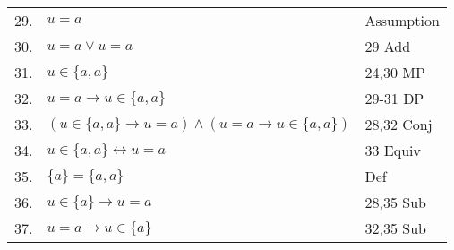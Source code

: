 \documentclass[12pt, a4paper]{article}
\begin{document}
\begin{table}[h!]
\begin{center}
\begin{tabular}{l l l}
        29.& $u=a$ & Assumption\\
        
        30.& \hspace{10mm}$u=a\vee u=a$ & 29 Add\\
        
        31.& \hspace{10mm}$u\in\{a,a\}$ & 24,30 MP\\
        
        32.& $u=a\rightarrow u\in\{a,a\}$ & 29-31 DP\\
        
        33.& $(u\in\{a,a\}\rightarrow u=a)\wedge(u=a\rightarrow u\in\{a,a\})$ & 28,32 Conj\\
        
        34.& $u\in\{a,a\}\leftrightarrow u=a$ & 33 Equiv\\
        
        35.& $\{a\}=\{a,a\}$ & Def\\
        
        36.& $u\in\{a\}\rightarrow u=a$ & 28,35 Sub\\
        
        37.& $u=a\rightarrow u\in\{a\}$ & 32,35 Sub\\
            
        \hline
        \end{tabular}
    \end{center}
\end{table}


\restoregeometry

\newpage

\end{document}
